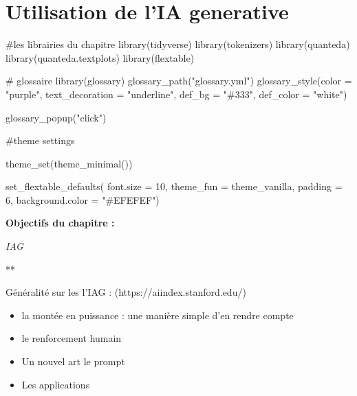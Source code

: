 \documentclass[
  letterpaper,
  DIV=11,
  numbers=noendperiod]{scrreprt}
\newenvironment{Shaded}{\begin{snugshade}}{\end{snugshade}}
\newcommand{\AttributeTok}[1]{\textcolor[rgb]{0.40,0.45,0.13}{#1}}
\newcommand{\CommentTok}[1]{\textcolor[rgb]{0.37,0.37,0.37}{#1}}
\newcommand{\DecValTok}[1]{\textcolor[rgb]{0.68,0.00,0.00}{#1}}
\newcommand{\FunctionTok}[1]{\textcolor[rgb]{0.28,0.35,0.67}{#1}}
\newcommand{\NormalTok}[1]{\textcolor[rgb]{0.00,0.23,0.31}{#1}}
\newcommand{\StringTok}[1]{\textcolor[rgb]{0.13,0.47,0.30}{#1}}
\providecommand{\tightlist}{%
  \setlength{\itemsep}{0pt}\setlength{\parskip}{0pt}}\usepackage{longtable,booktabs,array}
\begin{document}

\chapter{Utilisation de l'IA
generative}\label{utilisation-de-lia-generative}

\begin{Shaded}
\begin{Highlighting}[]
\CommentTok{\#les librairies du chapitre}
\FunctionTok{library}\NormalTok{(tidyverse)}
\FunctionTok{library}\NormalTok{(tokenizers)}
\FunctionTok{library}\NormalTok{(quanteda)}
\FunctionTok{library}\NormalTok{(quanteda.textplots)}
\FunctionTok{library}\NormalTok{(flextable)}

\CommentTok{\# glossaire}
\FunctionTok{library}\NormalTok{(glossary)}
\FunctionTok{glossary\_path}\NormalTok{(}\StringTok{"glossary.yml"}\NormalTok{)}
\FunctionTok{glossary\_style}\NormalTok{(}\AttributeTok{color =} \StringTok{"purple"}\NormalTok{, }
               \AttributeTok{text\_decoration =} \StringTok{"underline"}\NormalTok{,}
               \AttributeTok{def\_bg =} \StringTok{"\#333"}\NormalTok{,}
               \AttributeTok{def\_color =} \StringTok{"white"}\NormalTok{)}
\end{Highlighting}
\end{Shaded}

\begin{Shaded}
\begin{Highlighting}[]
\FunctionTok{glossary\_popup}\NormalTok{(}\StringTok{"click"}\NormalTok{)}

\CommentTok{\#theme settings}

\FunctionTok{theme\_set}\NormalTok{(}\FunctionTok{theme\_minimal}\NormalTok{()) }

\FunctionTok{set\_flextable\_defaults}\NormalTok{(}
  \AttributeTok{font.size =} \DecValTok{10}\NormalTok{, }\AttributeTok{theme\_fun =}\NormalTok{ theme\_vanilla,}
  \AttributeTok{padding =} \DecValTok{6}\NormalTok{,}
  \AttributeTok{background.color =} \StringTok{"\#EFEFEF"}\NormalTok{)}
\end{Highlighting}
\end{Shaded}

\textbf{Objectifs du chapitre :}

\emph{IAG}

**

Généralité sur les l'IAG : (https://aiindex.stanford.edu/)

\begin{itemize}
\tightlist
\item
  la montée en puissance : une manière simple d'en rendre compte
\item
  le renforcement humain
\item
  Un nouvel art le prompt
\item
  Les applications
\end{itemize}
\end{document}
